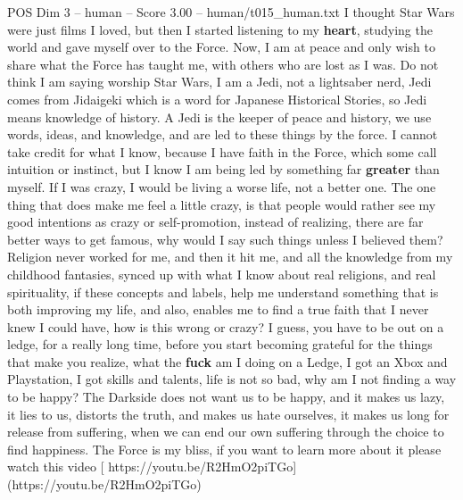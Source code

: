 \begin{textsample}{POS Dim 3 – human – Score 3.00 – human/t015\_human.txt}  \label{ex:f3_pos_010}
I thought Star Wars were just films I loved, but then I started listening to my \textbf{heart}, studying the world and gave myself over to the Force.
Now, I am at peace and only wish to share what the Force has taught me, with others who are lost as I was.
Do not think I am saying worship Star Wars, I am a Jedi, not a lightsaber nerd, Jedi comes from Jidaigeki which is a word for Japanese Historical Stories, so Jedi means knowledge of history.
A Jedi is the keeper of peace and history, we use words, ideas, and knowledge, and are led to these things by the force.
I cannot take credit for what I know, because I have faith in the Force, which some call intuition or instinct, but I know I am being led by something far \textbf{greater} than myself.
If I was crazy, I would be living a worse life, not a better one.
The one thing that does make me feel a little crazy, is that people would rather see my good intentions as crazy or self-promotion, instead of realizing, there are far better ways to get famous, why would I say such things unless I believed them?
Religion never worked for me, and then it hit me, and all the knowledge from my childhood fantasies, synced up with what I know about real religions, and real spirituality, if these concepts and labels, help me understand something that is both improving my life, and also, enables me to find a true faith that I never knew I could have, how is this wrong or crazy?
I guess, you have to be out on a ledge, for a really long time, before you start becoming grateful for the things that make you realize, what the \textbf{fuck} am I doing on a Ledge, I got an Xbox and Playstation, I got skills and talents, life is not so bad, why am I not finding a way to be happy?
The Darkside does not want us to be happy, and it makes us lazy, it lies to us, distorts the truth, and makes us hate ourselves, it makes us long for release from suffering, when we can end our own suffering through the choice to find happiness.
The Force is my bliss, if you want to learn more about it please watch this video [ https://youtu.be/R2HmO2piTGo](https://youtu.be/R2HmO2piTGo)

\end{textsample}
